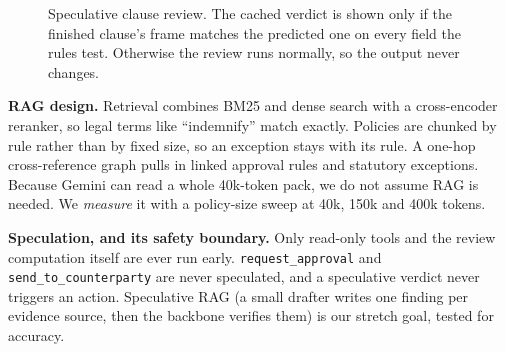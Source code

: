 \documentclass[11pt,a4paper]{article}
\begin{document}
\begin{figure}[H]
\centering
{}
\caption{Speculative clause review. The cached verdict is shown only if the finished clause's frame matches the predicted one on every field the rules test. Otherwise the review runs normally, so the output never changes.}
\end{figure}

\textbf{RAG design.} Retrieval combines BM25 and dense search with a cross-encoder reranker, so legal terms like ``indemnify'' match exactly. Policies are chunked by rule rather than by fixed size, so an exception stays with its rule. A one-hop cross-reference graph pulls in linked approval rules and statutory exceptions. Because Gemini can read a whole 40k-token pack, we do not assume RAG is needed. We \emph{measure} it with a policy-size sweep at 40k, 150k and 400k tokens.

\textbf{Speculation, and its safety boundary.} Only read-only tools and the review computation itself are ever run early. \texttt{request\_approval} and \texttt{send\_to\_counterparty} are never speculated, and a speculative verdict never triggers an action. Speculative RAG (a small drafter writes one finding per evidence source, then the backbone verifies them) is our stretch goal, tested for accuracy.
\end{document}
